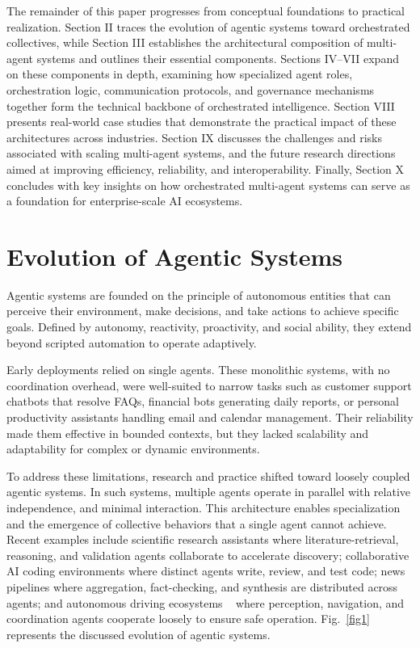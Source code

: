 \documentclass[conference]{IEEEtran}
\begin{document}
The remainder of this paper progresses from conceptual foundations to practical realization. Section II traces the evolution of agentic systems toward orchestrated collectives, while Section III establishes the architectural composition of multi-agent systems and outlines their essential components. Sections IV–VII expand on these components in depth, examining how specialized agent roles, orchestration logic, communication protocols, and governance mechanisms together form the technical backbone of orchestrated intelligence. Section VIII presents real-world case studies that demonstrate the practical impact of these architectures across industries. Section IX discusses the challenges and risks associated with scaling multi-agent systems, and the future research directions aimed at improving efficiency, reliability, and interoperability. Finally, Section X concludes with key insights on how orchestrated multi-agent systems can serve as a foundation for enterprise-scale AI ecosystems.

\section{Evolution of Agentic Systems}

Agentic systems are founded on the principle of autonomous entities that can perceive their environment, make decisions, and take actions to achieve specific goals. Defined by autonomy, reactivity, proactivity, and social ability, they extend beyond scripted automation to operate adaptively.  

Early deployments relied on single agents. These monolithic systems, with no coordination overhead, were well-suited to narrow tasks such as customer support chatbots that resolve FAQs, financial bots generating daily reports, or personal productivity assistants handling email and calendar management. Their reliability made them effective in bounded contexts, but they lacked scalability and adaptability for complex or dynamic environments. 

To address these limitations, research and practice shifted toward loosely coupled agentic systems. In such systems, multiple agents operate in parallel with relative independence, and minimal interaction. This architecture enables specialization and the emergence of collective behaviors that a single agent cannot achieve. Recent examples include scientific research assistants \cite{agentlab25} where literature-retrieval, reasoning, and validation agents collaborate to accelerate discovery; collaborative AI coding environments\cite{agentcoder23} where distinct agents write, review, and test code; news pipelines \cite{factcheck25} where aggregation, fact-checking, and synthesis are distributed across agents; and autonomous driving ecosystems ~\cite{koma24} where perception, navigation, and coordination agents cooperate loosely to ensure safe operation. 
Fig.~\ref{fig1} represents the discussed evolution of agentic systems.
\end{document}
